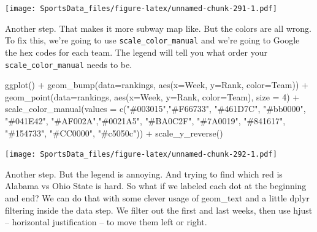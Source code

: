 \documentclass[
]{book}
\newenvironment{Shaded}{\begin{snugshade}}{\end{snugshade}}
\newcommand{\AttributeTok}[1]{\textcolor[rgb]{0.77,0.63,0.00}{#1}}
\newcommand{\DecValTok}[1]{\textcolor[rgb]{0.00,0.00,0.81}{#1}}
\newcommand{\FunctionTok}[1]{\textcolor[rgb]{0.00,0.00,0.00}{#1}}
\newcommand{\NormalTok}[1]{#1}
\newcommand{\SpecialCharTok}[1]{\textcolor[rgb]{0.00,0.00,0.00}{#1}}
\newcommand{\StringTok}[1]{\textcolor[rgb]{0.31,0.60,0.02}{#1}}
\begin{document}
\texttt{[image: SportsData\_files/figure-latex/unnamed-chunk-291-1.pdf]}

Another step. That makes it more subway map like. But the colors are all wrong. To fix this, we're going to use \texttt{scale\_color\_manual} and we're going to Google the hex codes for each team. The legend will tell you what order your \texttt{scale\_color\_manual} needs to be.

\begin{Shaded}
\begin{Highlighting}[]
\FunctionTok{ggplot}\NormalTok{() }\SpecialCharTok{+} 
  \FunctionTok{geom\_bump}\NormalTok{(}\AttributeTok{data=}\NormalTok{rankings, }\FunctionTok{aes}\NormalTok{(}\AttributeTok{x=}\NormalTok{Week, }\AttributeTok{y=}\NormalTok{Rank, }\AttributeTok{color=}\NormalTok{Team)) }\SpecialCharTok{+} 
  \FunctionTok{geom\_point}\NormalTok{(}\AttributeTok{data=}\NormalTok{rankings, }\FunctionTok{aes}\NormalTok{(}\AttributeTok{x=}\NormalTok{Week, }\AttributeTok{y=}\NormalTok{Rank, }\AttributeTok{color=}\NormalTok{Team), }\AttributeTok{size =} \DecValTok{4}\NormalTok{) }\SpecialCharTok{+} 
  \FunctionTok{scale\_color\_manual}\NormalTok{(}\AttributeTok{values =} \FunctionTok{c}\NormalTok{(}\StringTok{"\#003015"}\NormalTok{,}\StringTok{"\#F66733"}\NormalTok{, }\StringTok{"\#461D7C"}\NormalTok{, }\StringTok{"\#bb0000"}\NormalTok{, }\StringTok{"\#041E42"}\NormalTok{, }\StringTok{"\#AF002A"}\NormalTok{,}\StringTok{"\#0021A5"}\NormalTok{, }\StringTok{"\#BA0C2F"}\NormalTok{, }\StringTok{"\#7A0019"}\NormalTok{, }\StringTok{"\#841617"}\NormalTok{, }\StringTok{"\#154733"}\NormalTok{, }\StringTok{"\#CC0000"}\NormalTok{, }\StringTok{"\#c5050c"}\NormalTok{)) }\SpecialCharTok{+}
  \FunctionTok{scale\_y\_reverse}\NormalTok{() }
\end{Highlighting}
\end{Shaded}

\texttt{[image: SportsData\_files/figure-latex/unnamed-chunk-292-1.pdf]}

Another step. But the legend is annoying. And trying to find which red is Alabama vs Ohio State is hard. So what if we labeled each dot at the beginning and end? We can do that with some clever usage of geom\_text and a little dplyr filtering inside the data step. We filter out the first and last weeks, then use hjust -- horizontal justification -- to move them left or right.
\end{document}
